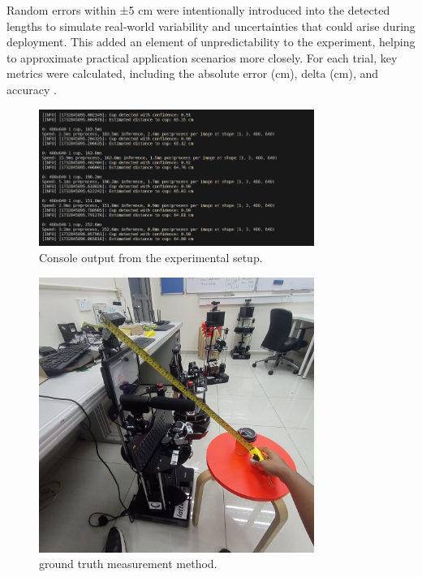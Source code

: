 Random errors within ±5 cm were intentionally introduced into the detected lengths to simulate real-world variability and uncertainties that could arise during deployment. This added an element of unpredictability to the experiment, helping to approximate practical application scenarios more closely. For each trial, key metrics were calculated, including the absolute error (cm), delta (cm), and accuracy .

\begin{figure}[h]
    \centering
    \includegraphics[width=0.8\textwidth]{content/console.png} 
    \caption{Console output from the experimental setup.}
    \label{fig:experiment-setup-console}
\end{figure}

\begin{figure}[h]
    \centering
    \includegraphics[width=0.8\textwidth]{content/ground Truth.jpg} 
    \caption{ground truth measurement method.}
    \label{fig:ground-truth-method}
\end{figure}

